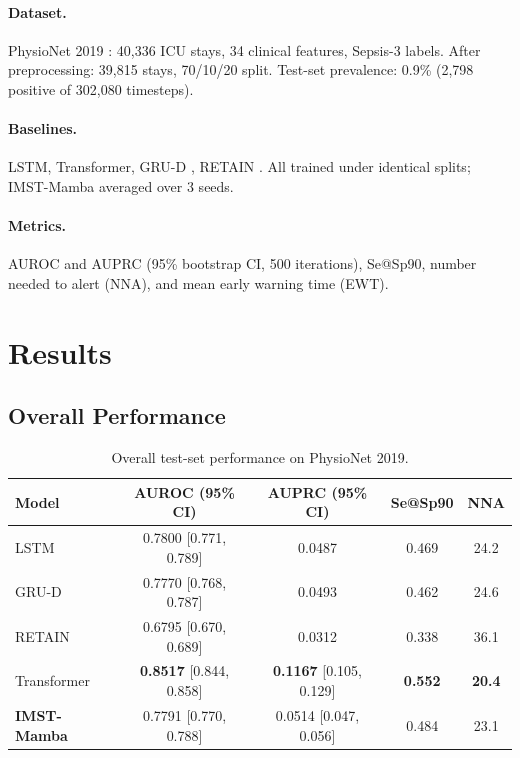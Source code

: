 \documentclass[11pt,a4paper]{article}
\begin{document}
\paragraph{Dataset.}
PhysioNet 2019 \citep{reyna2020early}: 40,336 ICU stays, 34 clinical features,
Sepsis-3 labels.  After preprocessing: 39,815 stays, 70/10/20 split.
Test-set prevalence: 0.9\% (2,798 positive of 302,080 timesteps).

\paragraph{Baselines.}
LSTM, Transformer, GRU-D \citep{che2018gruD}, RETAIN \citep{choi2016retain}.
All trained under identical splits; IMST-Mamba averaged over 3 seeds.

\paragraph{Metrics.}
AUROC and AUPRC (95\% bootstrap CI, 500 iterations), Se@Sp90, number needed
to alert (NNA), and mean early warning time (EWT).

\section{Results}
\label{sec:results}

\subsection{Overall Performance}

\begin{table}[h]
\centering
\caption{Overall test-set performance on PhysioNet 2019.}
\label{tab:overall}
\begin{tabular}{lcccc}
\toprule
Model & AUROC (95\% CI) & AUPRC (95\% CI) & Se@Sp90 & NNA \\
\midrule
LSTM        & 0.7800 \small{[0.771, 0.789]} & 0.0487 & 0.469 & 24.2 \\
GRU-D       & 0.7770 \small{[0.768, 0.787]} & 0.0493 & 0.462 & 24.6 \\
RETAIN      & 0.6795 \small{[0.670, 0.689]} & 0.0312 & 0.338 & 36.1 \\
Transformer & \textbf{0.8517} \small{[0.844, 0.858]}
            & \textbf{0.1167} \small{[0.105, 0.129]}
            & \textbf{0.552} & \textbf{20.4} \\
\midrule
\textbf{IMST-Mamba}
            & 0.7791 \small{[0.770, 0.788]}
            & 0.0514 \small{[0.047, 0.056]}
            & 0.484 & 23.1 \\
\bottomrule
\end{tabular}
\end{table}
\end{document}
